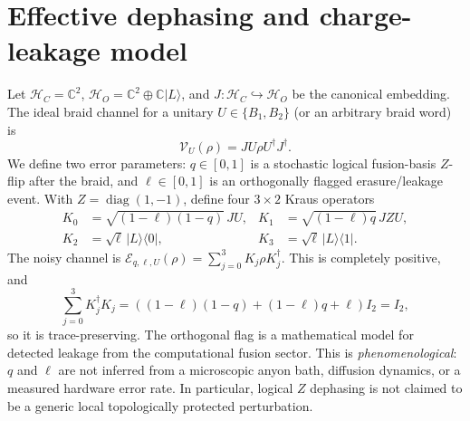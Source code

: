 \documentclass[11pt,a4paper]{article}
\theoremstyle{remark}
\newcommand{\Cd}{\mathbb{C}}
\begin{document}
\section{Effective dephasing and charge-leakage model}
Let $\mathcal H_C=\Cd^2$, $\mathcal H_O=\Cd^2\oplus\Cd|L\rangle$, and $J:\mathcal H_C\hookrightarrow\mathcal H_O$ be the canonical embedding. The ideal braid channel for a unitary $U\in\{B_1,B_2\}$ (or an arbitrary braid word) is
\begin{equation}
\mathcal V_U(\rho)=JU\rho U^\dagger J^\dagger.
\end{equation}
We define two error parameters: $q\in[0,1]$ is a stochastic logical fusion-basis $Z$-flip after the braid, and $\ell\in[0,1]$ is an orthogonally flagged erasure/leakage event. With $Z=\operatorname{diag}(1,-1)$, define four $3\times2$ Kraus operators
\begin{align}\label{eq:kraus}
K_0&=\sqrt{(1-\ell)(1-q)}\,JU, &
K_1&=\sqrt{(1-\ell)q}\,JZU,\\
K_2&=\sqrt\ell\,|L\rangle\langle0|, &
K_3&=\sqrt\ell\,|L\rangle\langle1|.
\end{align}
The noisy channel is $\mathcal E_{q,\ell,U}(\rho)=\sum_{j=0}^3K_j\rho K_j^\dagger$. This is completely positive, and
\[
\sum_{j=0}^3K_j^\dagger K_j
=((1-\ell)(1-q)+(1-\ell)q+\ell)I_2=I_2,
\]
so it is trace-preserving. The orthogonal flag is a mathematical model for detected leakage from the computational fusion sector. This is \emph{phenomenological}: $q$ and $\ell$ are not inferred from a microscopic anyon bath, diffusion dynamics, or a measured hardware error rate. In particular, logical $Z$ dephasing is not claimed to be a generic local topologically protected perturbation.
\end{document}
